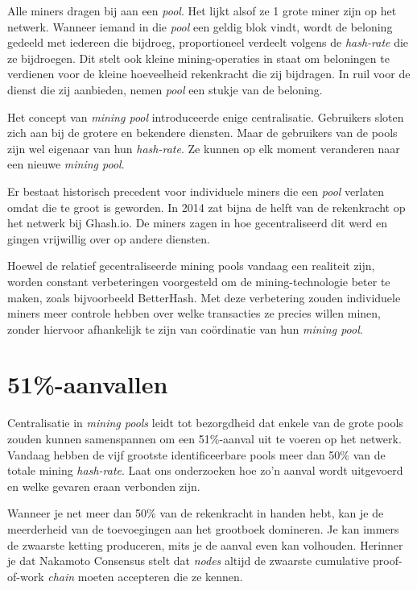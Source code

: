 Alle miners dragen bij aan een \textit{pool}. Het lijkt alsof ze 1 grote miner zijn op het netwerk. Wanneer iemand in die \textit{pool} een geldig blok vindt, wordt de beloning gedeeld met iedereen die bijdroeg, proportioneel verdeelt volgens de \textit{hash-rate} die ze bijdroegen. Dit stelt ook kleine mining-operaties in staat om beloningen te verdienen voor de kleine hoeveelheid rekenkracht die zij bijdragen. In ruil voor de dienst die zij aanbieden, nemen \textit{pool} een stukje van de beloning.

Het concept van \textit{mining pool} introduceerde enige centralisatie. Gebruikers sloten zich aan bij de grotere en bekendere diensten. Maar de gebruikers van de pools zijn wel eigenaar van hun \textit{hash-rate}. Ze kunnen op elk moment veranderen naar een nieuwe \textit{mining pool}.

Er bestaat historisch precedent voor individuele miners die een \textit{pool} verlaten omdat die te groot is geworden. In 2014 zat bijna de helft van de rekenkracht op het netwerk bij Ghash.io. De miners zagen in hoe gecentraliseerd dit werd en gingen vrijwillig over op andere diensten.

Hoewel de relatief gecentraliseerde mining pools vandaag een realiteit zijn, worden constant verbeteringen voorgesteld om de mining-technologie beter te maken, zoals bijvoorbeeld BetterHash. Met deze verbetering zouden individuele miners meer controle hebben over welke transacties ze precies willen minen, zonder hiervoor afhankelijk te zijn van coördinatie van hun \textit{mining pool}.

\section{51\%-aanvallen}
Centralisatie in \textit{mining pools} leidt tot bezorgdheid dat enkele van de grote pools zouden kunnen samenspannen om een 51\%-aanval uit te voeren op het netwerk. Vandaag hebben de vijf grootste identificeerbare pools meer dan 50\% van de totale mining \textit{hash-rate}. Laat ons onderzoeken hoe zo’n aanval wordt uitgevoerd en welke gevaren eraan verbonden zijn.

Wanneer je net meer dan 50\% van de rekenkracht in handen hebt, kan je de meerderheid van de toevoegingen aan het grootboek domineren. Je kan immers de zwaarste ketting produceren, mits je de aanval even kan volhouden. Herinner je dat Nakamoto Consensus stelt dat \textit{nodes} altijd de zwaarste cumulative proof-of-work \textit{chain} moeten accepteren die ze kennen.

